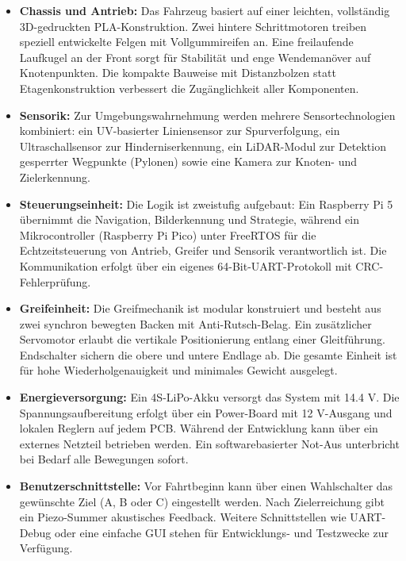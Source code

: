 \documentclass[main.tex]{subfiles} %
\begin{document}
\begin{itemize}
    \item \textbf{Chassis und Antrieb:} 
    Das Fahrzeug basiert auf einer leichten, vollständig 3D-gedruckten PLA-Konstruktion. 
    Zwei hintere Schrittmotoren treiben speziell entwickelte Felgen mit Vollgummireifen 
    an. Eine freilaufende Laufkugel an der Front sorgt für Stabilität und enge 
    Wendemanöver auf Knotenpunkten. Die kompakte Bauweise mit Distanzbolzen statt 
    Etagenkonstruktion verbessert die Zugänglichkeit aller Komponenten.
    
    \item \textbf{Sensorik:} 
    Zur Umgebungswahrnehmung werden mehrere Sensortechnologien kombiniert: ein 
    UV-basierter Liniensensor zur Spurverfolgung, ein Ultraschallsensor zur 
    Hinderniserkennung, ein LiDAR-Modul zur Detektion gesperrter Wegpunkte (Pylonen) 
    sowie eine Kamera zur Knoten- und Zielerkennung.
    
    \item \textbf{Steuerungseinheit:} 
    Die Logik ist zweistufig aufgebaut: Ein Raspberry Pi 5 übernimmt die Navigation, 
    Bilderkennung und Strategie, während ein Mikrocontroller (Raspberry Pi Pico) unter 
    FreeRTOS für die Echtzeitsteuerung von Antrieb, Greifer und Sensorik verantwortlich 
    ist. Die Kommunikation erfolgt über ein eigenes 64-Bit-UART-Protokoll mit 
    CRC-Fehlerprüfung.
    
    \item \textbf{Greifeinheit:} 
    Die Greifmechanik ist modular konstruiert und besteht aus zwei synchron bewegten 
    Backen mit Anti-Rutsch-Belag. Ein zusätzlicher Servomotor erlaubt die vertikale 
    Positionierung entlang einer Gleitführung. Endschalter sichern die obere und untere 
    Endlage ab. Die gesamte Einheit ist für hohe Wiederholgenauigkeit und minimales 
    Gewicht ausgelegt.
    
    \item \textbf{Energieversorgung:} 
    Ein 4S-LiPo-Akku versorgt das System mit 14.4 V. Die Spannungsaufbereitung erfolgt 
    über ein Power-Board mit 12 V-Ausgang und lokalen Reglern auf jedem PCB. Während 
    der Entwicklung kann über ein externes Netzteil betrieben werden. Ein 
    softwarebasierter Not-Aus unterbricht bei Bedarf alle Bewegungen sofort.
    
    \item \textbf{Benutzerschnittstelle:} 
    Vor Fahrtbeginn kann über einen Wahlschalter das gewünschte Ziel (A, B oder C) 
    eingestellt werden. Nach Zielerreichung gibt ein Piezo-Summer akustisches Feedback. 
    Weitere Schnittstellen wie UART-Debug oder eine einfache GUI stehen für Entwicklungs- 
    und Testzwecke zur Verfügung.
\end{itemize}
\end{document}
